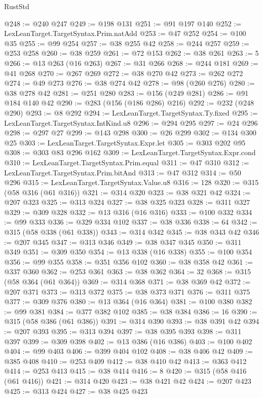 \begin{lexlean}{RustStd}
\begin{coremodule}
@248 := @240 @247
@249 := @198 @131
@251 := @91 @197 @140
@252 := LexLeanTarget.TargetSyntax.Prim.natAdd
@253 := @47 @252
@254 := @100 @35
@255 := @99 @254
@257 := @38 @255 @42
@258 := @244 @257
@259 := @253 @258
@260 := @38 @259
@261 := @72 @153
@262 := @38 @261
@263 := 5
@266 := @13 @263 (@16 @263)
@267 := @31 @266
@268 := @244 @181
@269 := @41 @268
@270 := @267 @269
@272 := @38 @270 @42
@273 := @262 @272
@274 := @49 @273
@276 := @38 @274 @42
@278 := @98 (@260 @276)
@280 := @38 @278 @42
@281 := @251 @280
@283 := @156 (@249 @281)
@286 := @91 @184 @140 @42
@290 := @283 (@156 (@186 @286) @216)
@292 := @232 (@248 @290)
@293 := @8 @292
@294 := LexLeanTarget.TargetSyntax.Ty.fixed
@295 := LexLeanTarget.TargetSyntax.IntKind.u8
@296 := @294 @295
@297 := @24 @296
@298 := @297 @27
@299 := @143 @298
@300 := @26 @299
@302 := @134 @300 @25
@303 := LexLeanTarget.TargetSyntax.Expr.let
@305 := @303 @202 @95
@308 := @303 @83 @296 @162
@309 := LexLeanTarget.TargetSyntax.Expr.cond
@310 := LexLeanTarget.TargetSyntax.Prim.equal
@311 := @47 @310
@312 := LexLeanTarget.TargetSyntax.Prim.bitAnd
@313 := @47 @312
@314 := @50 @296
@315 := LexLeanTarget.TargetSyntax.Value.u8
@316 := 128
@320 := @315 (@58 @316 (@61 @316))
@321 := @314 @320
@323 := @38 @321 @42
@324 := @207 @323
@325 := @313 @324
@327 := @38 @325 @323
@328 := @311 @327
@329 := @309 @328
@332 := @13 @316 (@16 @316)
@333 := @100 @332
@334 := @99 @333
@336 := @329 @334 @102
@337 := @38 @336
@338 := 64
@342 := @315 (@58 @338 (@61 @338))
@343 := @314 @342
@345 := @38 @343 @42
@346 := @207 @345
@347 := @313 @346
@349 := @38 @347 @345
@350 := @311 @349
@351 := @309 @350
@354 := @13 @338 (@16 @338)
@355 := @100 @354
@356 := @99 @355
@358 := @351 @356 @102
@360 := @38 @358 @42
@361 := @337 @360
@362 := @253 @361
@363 := @38 @362
@364 := 32
@368 := @315 (@58 @364 (@61 @364))
@369 := @314 @368
@371 := @38 @369 @42
@372 := @207 @371
@373 := @313 @372
@375 := @38 @373 @371
@376 := @311 @375
@377 := @309 @376
@380 := @13 @364 (@16 @364)
@381 := @100 @380
@382 := @99 @381
@384 := @377 @382 @102
@385 := @38 @384
@386 := 16
@390 := @315 (@58 @386 (@61 @386))
@391 := @314 @390
@393 := @38 @391 @42
@394 := @207 @393
@395 := @313 @394
@397 := @38 @395 @393
@398 := @311 @397
@399 := @309 @398
@402 := @13 @386 (@16 @386)
@403 := @100 @402
@404 := @99 @403
@406 := @399 @404 @102
@408 := @38 @406 @42
@409 := @385 @408
@410 := @253 @409
@412 := @38 @410 @42
@413 := @363 @412
@414 := @253 @413
@415 := @38 @414
@416 := 8
@420 := @315 (@58 @416 (@61 @416))
@421 := @314 @420
@423 := @38 @421 @42
@424 := @207 @423
@425 := @313 @424
@427 := @38 @425 @423

\end{coremodule}
\end{lexlean}
